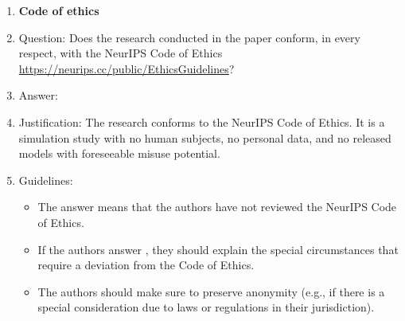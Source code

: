 \begin{enumerate}
\item {\bf Code of ethics}
    \item[] Question: Does the research conducted in the paper conform, in every respect, with the NeurIPS Code of Ethics \url{https://neurips.cc/public/EthicsGuidelines}?
    \item[] Answer: \answerYes{} %
    \item[] Justification: The research conforms to the NeurIPS Code of Ethics. It is a simulation study with no human subjects, no personal data, and no released models with foreseeable misuse potential.
    \item[] Guidelines:
    \begin{itemize}
        \item The answer \answerNA{} means that the authors have not reviewed the NeurIPS Code of Ethics.
        \item If the authors answer \answerNo, they should explain the special circumstances that require a deviation from the Code of Ethics.
        \item The authors should make sure to preserve anonymity (e.g., if there is a special consideration due to laws or regulations in their jurisdiction).
    \end{itemize}



\end{enumerate}
